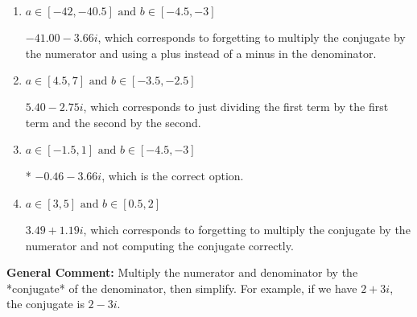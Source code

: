 \documentclass{extbook}[14pt]
\begin{document}
\begin{enumerate}
{\begin{enumerate}[label=\Alph*.]
 $-0.46  - 326.00 i$, which corresponds to forgetting to multiply the conjugate by the numerator.
\item \( a \in [-42, -40.5] \text{ and } b \in [-4.5, -3] \)

 $-41.00  - 3.66 i$, which corresponds to forgetting to multiply the conjugate by the numerator and using a plus instead of a minus in the denominator.
\item \( a \in [4.5, 7] \text{ and } b \in [-3.5, -2.5] \)

 $5.40  - 2.75 i$, which corresponds to just dividing the first term by the first term and the second by the second.
\item \( a \in [-1.5, 1] \text{ and } b \in [-4.5, -3] \)

* $-0.46  - 3.66 i$, which is the correct option.
\item \( a \in [3, 5] \text{ and } b \in [0.5, 2] \)

 $3.49  + 1.19 i$, which corresponds to forgetting to multiply the conjugate by the numerator and not computing the conjugate correctly.
\end{enumerate}

\textbf{General Comment:} Multiply the numerator and denominator by the *conjugate* of the denominator, then simplify. For example, if we have $2+3i$, the conjugate is $2-3i$.
}
\end{enumerate}
\end{document}
